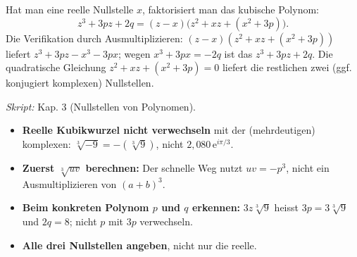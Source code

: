 \begin{werkzeugkasten}
Hat man eine reelle Nullstelle $x$, faktorisiert man das kubische Polynom:
\begin{equation*}
  z^3+3pz+2q=(z-x)\bigl(z^2+xz+(x^2+3p)\bigr).
\end{equation*}
Die Verifikation durch Ausmultiplizieren: $(z-x)(z^2+xz+(x^2+3p))$ liefert
$z^3+3pz-x^3-3px$; wegen $x^3+3px=-2q$ ist das $z^3+3pz+2q$. Die
quadratische Gleichung $z^2+xz+(x^2+3p)=0$ liefert die restlichen zwei
(ggf. konjugiert komplexen) Nullstellen.

\textit{Skript:} Kap. 3 (Nullstellen von Polynomen).
\end{werkzeugkasten}

\begin{achtung}
\begin{itemize}
  \item \textbf{Reelle Kubikwurzel nicht verwechseln} mit der (mehrdeutigen)
        komplexen: $\sqrt[3]{-9}=-(\sqrt[3]{9})$, nicht $2{,}080\,\mathrm e^{i\pi/3}$.
  \item \textbf{Zuerst $\sqrt[3]{uv}$ berechnen:} Der schnelle Weg nutzt
        $uv=-p^3$, nicht ein Ausmultiplizieren von $(a+b)^3$.
  \item \textbf{Beim konkreten Polynom $p$ und $q$ erkennen:}
        $3z\sqrt[3]{9}$ heisst $3p=3\sqrt[3]{9}$ und $2q=8$; nicht $p$ mit
        $3p$ verwechseln.
  \item \textbf{Alle drei Nullstellen angeben}, nicht nur die reelle.
\end{itemize}
\end{achtung}
